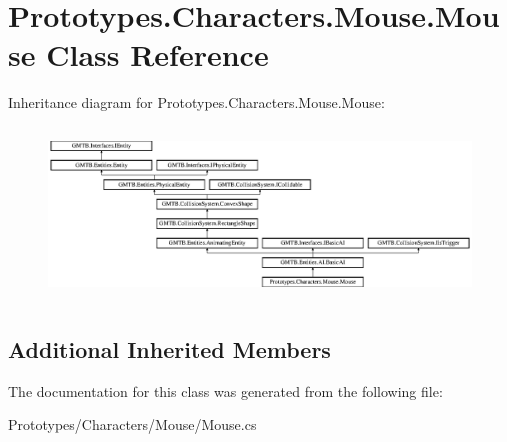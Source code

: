 \hypertarget{class_prototypes_1_1_characters_1_1_mouse_1_1_mouse}{}\section{Prototypes.\+Characters.\+Mouse.\+Mouse Class Reference}
\label{class_prototypes_1_1_characters_1_1_mouse_1_1_mouse}
Inheritance diagram for Prototypes.\+Characters.\+Mouse.\+Mouse\+:\begin{figure}[H]
\begin{center}
\leavevmode
\includegraphics[height=4.609054cm]{class_prototypes_1_1_characters_1_1_mouse_1_1_mouse}
\end{center}
\end{figure}
\subsection*{Additional Inherited Members}


The documentation for this class was generated from the following file\+:\begin{DoxyCompactItemize}
\item 
Prototypes/\+Characters/\+Mouse/Mouse.\+cs\end{DoxyCompactItemize}
